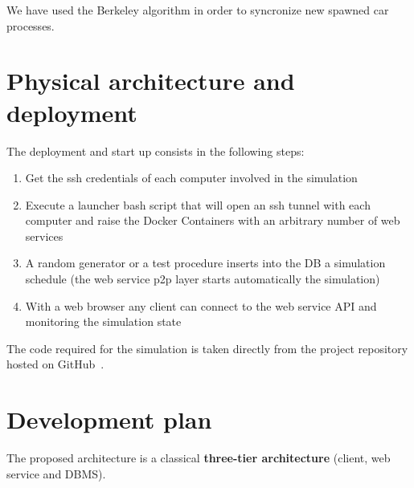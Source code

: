We have used the Berkeley algorithm in order to syncronize new spawned car processes.


\section{Physical architecture and deployment}

The deployment and start up consists in the following steps:
\begin{enumerate}
    \item Get the ssh credentials of each computer involved in the simulation
    \item Execute a launcher bash script that will open an ssh tunnel with each computer and 
        raise the Docker Containers with an arbitrary number of web services 
    \item A random generator or a test procedure inserts into the DB a simulation schedule
        (the web service p2p layer starts automatically the simulation)
    \item With a web browser any client can connect to the web service API and monitoring 
        the simulation state   
\end{enumerate}

The code required for the simulation is taken directly from the project repository hosted on 
GitHub~\cite{2}.


\section{Development plan}

The proposed architecture is a classical \textbf{three-tier architecture} 
(client, web service and DBMS).
